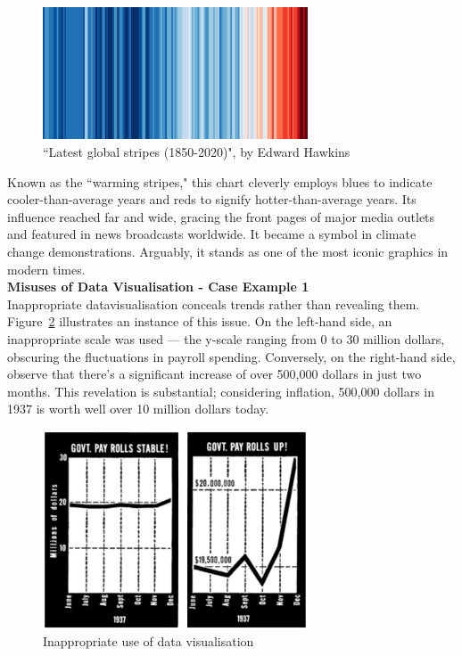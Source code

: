 \documentclass{article}\usepackage[]{graphicx}\usepackage[]{xcolor}
\begin{document}
\begin{figure}[H]
    \centering
    \includegraphics[width=0.7\textwidth]{image_reference/global.png}
    \caption{``Latest global stripes (1850-2020)", by Edward Hawkins\cite{blog}}
    \label{fig:global}
\end{figure}

\noindent 
Known as the ``warming stripes," this chart cleverly employs blues to indicate cooler-than-average years and reds to signify hotter-than-average years. Its influence reached far and wide, gracing the front pages of major media outlets and featured in news broadcasts worldwide. It became a symbol in climate change demonstrations. Arguably, it stands as one of the most iconic graphics in modern times.\\

\noindent
\textbf{Misuses of Data Visualisation - Case Example 1}\\

\noindent
Inappropriate datavisualisation conceals trends rather than revealing them. Figure~\ref{fig:misuse1} illustrates an instance of this issue. On the left-hand side, an inappropriate scale was used --- the y-scale ranging from 0 to 30 million dollars, obscuring the fluctuations in payroll spending. Conversely, on the right-hand side, observe that there's a significant increase of over 500,000 dollars in just two months. This revelation is substantial; considering inflation, 500,000 dollars in 1937 is worth well over 10 million dollars today\cite{worth}.

\begin{figure}[H]
    \centering
    \includegraphics[width=0.7\textwidth]{image_reference/misuse1.png}
    \caption{Inappropriate use of data visualisation\cite{lie}}
    \label{fig:misuse1}
\end{figure}
\end{document}
